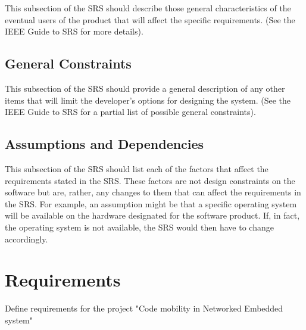 \documentclass{scrreprt}
\begin{document}
This subsection of the SRS should describe those general characteristics of the eventual users of the product that will affect the specific requirements.  (See the IEEE Guide to SRS for more details).

	\section{General Constraints}

This subsection of the SRS should provide a general description of any other items that will
limit the developer’s options for designing the system. (See the IEEE Guide to SRS for a partial list of possible general constraints).

	\section{Assumptions and Dependencies}

This subsection of the SRS should list each of the factors that affect the requirements stated in the SRS. These factors are not design constraints on the software but are, rather, any changes to them that can affect the requirements in the SRS. For example, an assumption might be that a specific operating system will be available on the hardware designated for the software product. If, in fact, the operating system is not available, the SRS would then have to change accordingly.

\chapter{Requirements}	

Define requirements for the project "Code mobility in Networked Embedded system"

\renewcommand{\labelenumi}{\arabic{enumi}}
\renewcommand{\labelenumii}{\arabic{enumi}.\arabic{enumii}}
\end{document}
